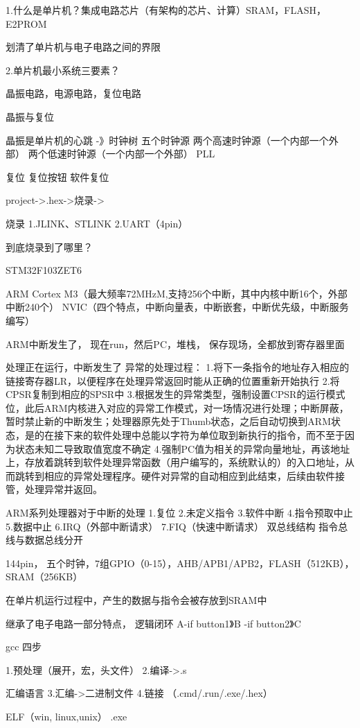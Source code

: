 \documentclass[UTF8]{ctexart}
\begin{document}
1.什么是单片机？集成电路芯片（有架构的芯片、计算）SRAM，FLASH，E2PROM

划清了单片机与电子电路之间的界限

2.单片机最小系统三要素？

晶振电路，电源电路，复位电路

晶振与复位

晶振是单片机的心跳
-》时钟树
五个时钟源
两个高速时钟源（一个内部一个外部）
两个低速时钟源（一个内部一个外部）
PLL


复位
复位按钮
软件复位

project->.hex->烧录->

烧录
1.JLINK、STLINK
2.UART（4pin）

到底烧录到了哪里？

STM32F103ZET6

ARM Cortex M3（最大频率72MHzM,支持256个中断，其中内核中断16个，外部中断240个）
NVIC（四个特点，中断向量表，中断嵌套，中断优先级，中断服务编写）

ARM中断发生了，
现在run，然后PC，堆栈，
保存现场，全都放到寄存器里面
      
处理正在运行，中断发生了
异常的处理过程：
1.将下一条指令的地址存入相应的链接寄存器LR，以便程序在处理异常返回时能从正确的位置重新开始执行
2.将CPSR复制到相应的SPSR中
3.根据发生的异常类型，强制设置CPSR的运行模式位，此后ARM内核进入对应的异常工作模式，对一场情况进行处理；中断屏蔽，暂时禁止新的中断发生；处理器原先处于Thumb状态，之后自动切换到ARM状态，是的在接下来的软件处理中总能以字符为单位取到新执行的指令，而不至于因为状态未知二导致取值宽度不确定
4.强制PC值为相关的异常向量地址，再该地址上，存放着跳转到软件处理异常函数（用户编写的，系统默认的）的入口地址，从而跳转到相应的异常处理程序。硬件对异常的自动相应到此结束，后续由软件接管，处理异常并返回。


ARM系列处理器对于中断的处理
1.复位
2.未定义指令
3.软件中断
4.指令预取中止
5.数据中止
6.IRQ（外部中断请求）
7.FIQ（快速中断请求）
双总线结构
指令总线与数据总线分开

144pin， 五个时钟，7组GPIO（0-15），AHB/APB1/APB2，FLASH（512KB），SRAM（256KB）

在单片机运行过程中，产生的数据与指令会被存放到SRAM中

继承了电子电路一部分特点，
逻辑闭环
A-if button1》B
  -if button2》C

gcc 四步

1.预处理（展开，宏，头文件）
2.编译->.s

汇编语言
3.汇编->二进制文件
4.链接 （.cmd/.run/.exe/.hex）

ELF（win, linux,unix）
.exe
\end{document}
